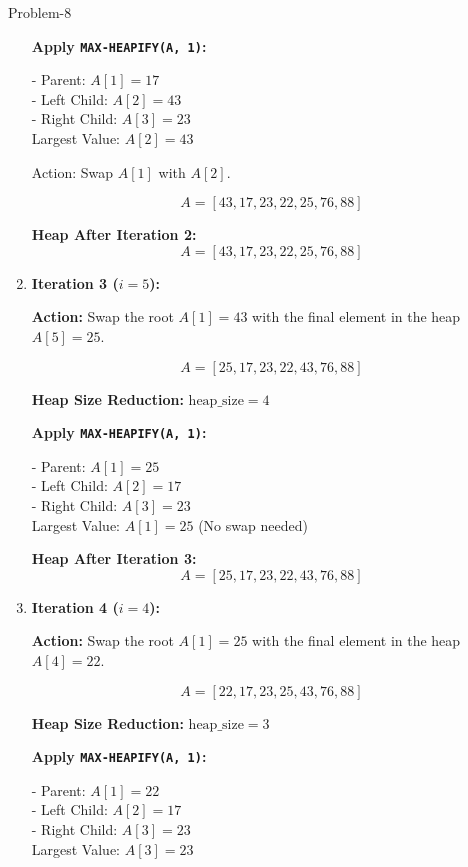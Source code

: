 \begin{problem}{}{Problem-8}
\begin{enumerate}[label=(\roman*)]
		\textbf{Apply \texttt{MAX-HEAPIFY(A, 1)}:}
		
		- Parent: \( A[1] = 17 \)\\
		- Left Child: \( A[2] = 43 \)\\
		- Right Child: \( A[3] = 23 \)\\
		
		Largest Value: \( A[2] = 43 \)
		
		Action: Swap \( A[1] \) with \( A[2] \).
		
		\[
		A = [43, 17, 23, 22, 25, 76, 88]
		\]
		
		\textbf{Heap After Iteration 2:}
		\[
		A = [43, 17, 23, 22, 25, 76, 88]
		\]
		
		\item \textbf{Iteration 3 (\( i = 5 \)):}
		
		\textbf{Action:} Swap the root \( A[1] = 43 \) with the final element in the heap \( A[5] = 25 \).
		
		\[
		A = [25, 17, 23, 22, 43, 76, 88]
		\]
		
		\textbf{Heap Size Reduction:} \( \text{heap\_size} = 4 \)
		
		\textbf{Apply \texttt{MAX-HEAPIFY(A, 1)}:}
		
		- Parent: \( A[1] = 25 \)\\
		- Left Child: \( A[2] = 17 \)\\
		- Right Child: \( A[3] = 23 \)\\
		
		Largest Value: \( A[1] = 25 \) (No swap needed)
		
		\textbf{Heap After Iteration 3:}
		\[
		A = [25, 17, 23, 22, 43, 76, 88]
		\]
		
		\item \textbf{Iteration 4 (\( i = 4 \)):}
		
		\textbf{Action:} Swap the root \( A[1] = 25 \) with the final element in the heap \( A[4] = 22 \).
		
		\[
		A = [22, 17, 23, 25, 43, 76, 88]
		\]
		
		\textbf{Heap Size Reduction:} \( \text{heap\_size} = 3 \)
		
		\textbf{Apply \texttt{MAX-HEAPIFY(A, 1)}:}
		
		- Parent: \( A[1] = 22 \)\\
		- Left Child: \( A[2] = 17 \)\\
		- Right Child: \( A[3] = 23 \)\\
		
		Largest Value: \( A[3] = 23 \)
		

\end{enumerate}
\end{problem}

